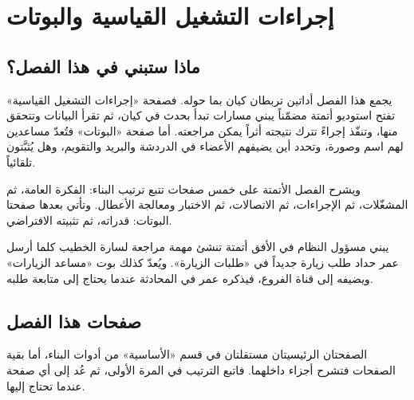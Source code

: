 \chapter{إجراءات التشغيل القياسية والبوتات}
\label{ch:builder-automations}

\section{ماذا ستبني في هذا الفصل؟}
\label{sec:builder-automations-intro}

يجمع هذا الفصل أداتين تربطان كيان بما حوله. فصفحة «إجراءات التشغيل القياسية» تفتح استوديو أتمتة مضمّناً يبني مسارات تبدأ بحدث في كيان، ثم تقرأ البيانات وتتحقق منها، وتنفّذ إجراءً تترك نتيجته أثراً يمكن مراجعته. أما صفحة «البوتات» فتُعدّ مساعدين لهم اسم وصورة، وتحدد أين يضيفهم الأعضاء في الدردشة والبريد والتقويم، وهل يُثبَّتون تلقائياً.

ويشرح الفصل الأتمتة على خمس صفحات تتبع ترتيب البناء: الفكرة العامة، ثم المشغّلات، ثم الإجراءات، ثم الاتصالات، ثم الاختبار ومعالجة الأعطال. وتأتي بعدها صفحتا البوتات: قدراته، ثم تثبيته الافتراضي.

\begin{rcnote}
يبني مسؤول النظام في الأفق أتمتة تنشئ مهمة مراجعة لسارة الخطيب كلما أرسل عمر حداد طلب زيارة جديداً في «طلبات الزيارة». ويُعدّ كذلك بوت «مساعد الزيارات» ويضيفه إلى قناة الفروع، فيذكره عمر في المحادثة عندما يحتاج إلى متابعة طلبه.
\end{rcnote}

\section{صفحات هذا الفصل}
\label{sec:builder-automations-pages}

الصفحتان الرئيسيتان مستقلتان في قسم «الأساسية» من أدوات البناء، أما بقية الصفحات فتشرح أجزاء داخلهما. فاتبع الترتيب في المرة الأولى، ثم عُد إلى أي صفحة عندما تحتاج إليها.


